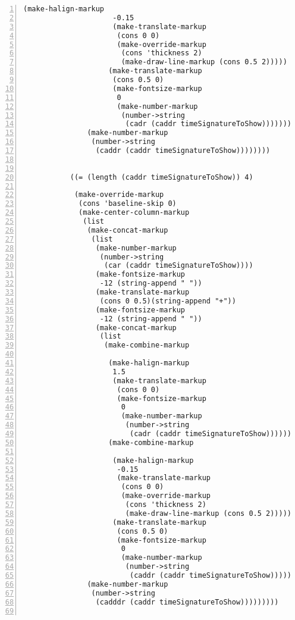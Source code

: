 \begin{Verbatim}[numbers=left,xleftmargin=5mm]
                    (make-halign-markup
                     -0.15
                     (make-translate-markup
                      (cons 0 0)
                      (make-override-markup
                       (cons 'thickness 2)
                       (make-draw-line-markup (cons 0.5 2)))))
                    (make-translate-markup
                     (cons 0.5 0)
                     (make-fontsize-markup
                      0
                      (make-number-markup
                       (number->string
                        (cadr (caddr timeSignatureToShow)))))))))))
               (make-number-markup
                (number->string
                 (caddr (caddr timeSignatureToShow))))))))


           ((= (length (caddr timeSignatureToShow)) 4)

            (make-override-markup
             (cons 'baseline-skip 0)
             (make-center-column-markup
              (list
               (make-concat-markup
                (list
                 (make-number-markup
                  (number->string
                   (car (caddr timeSignatureToShow))))
                 (make-fontsize-markup
                  -12 (string-append " "))
                 (make-translate-markup
                  (cons 0 0.5)(string-append "+"))
                 (make-fontsize-markup
                  -12 (string-append " "))
                 (make-concat-markup
                  (list
                   (make-combine-markup

                    (make-halign-markup
                     1.5
                     (make-translate-markup
                      (cons 0 0)
                      (make-fontsize-markup
                       0
                       (make-number-markup
                        (number->string
                         (cadr (caddr timeSignatureToShow)))))))
                    (make-combine-markup

                     (make-halign-markup
                      -0.15
                      (make-translate-markup
                       (cons 0 0)
                       (make-override-markup
                        (cons 'thickness 2)
                        (make-draw-line-markup (cons 0.5 2)))))
                     (make-translate-markup
                      (cons 0.5 0)
                      (make-fontsize-markup
                       0
                       (make-number-markup
                        (number->string
                         (caddr (caddr timeSignatureToShow))))))))))))
               (make-number-markup
                (number->string
                 (cadddr (caddr timeSignatureToShow)))))))))


\end{Verbatim}
